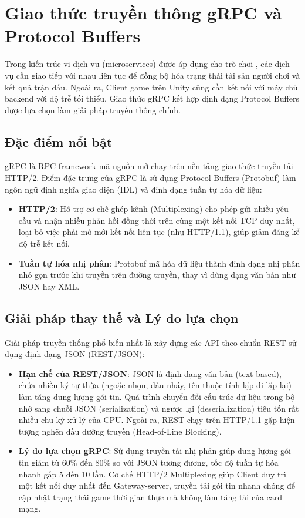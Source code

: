 \documentclass[../Project.tex]{subfiles}
\begin{document}
\section{Giao thức truyền thông gRPC và Protocol Buffers}
\label{sec:tech_grpc}
Trong kiến trúc vi dịch vụ (microservices) được áp dụng cho trò chơi \cite{newman2021building}, các dịch vụ cần giao tiếp với nhau liên tục để đồng bộ hóa trạng thái tài sản người chơi và kết quả trận đấu. Ngoài ra, Client game trên Unity cũng cần kết nối với máy chủ backend với độ trễ tối thiểu. Giao thức gRPC \cite{indrasiri2020grpc} kết hợp định dạng Protocol Buffers được lựa chọn làm giải pháp truyền thông chính.

\subsection{Đặc điểm nổi bật}
gRPC là RPC framework mã nguồn mở chạy trên nền tảng giao thức truyền tải HTTP/2. Điểm đặc trưng của gRPC là sử dụng Protocol Buffers (Protobuf) làm ngôn ngữ định nghĩa giao diện (IDL) và định dạng tuần tự hóa dữ liệu:
\begin{itemize}
    \item \textbf{HTTP/2}: Hỗ trợ cơ chế ghép kênh (Multiplexing) cho phép gửi nhiều yêu cầu và nhận nhiều phản hồi đồng thời trên cùng một kết nối TCP duy nhất, loại bỏ việc phải mở mới kết nối liên tục (như HTTP/1.1), giúp giảm đáng kể độ trễ kết nối.
    \item \textbf{Tuần tự hóa nhị phân}: Protobuf mã hóa dữ liệu thành định dạng nhị phân nhỏ gọn trước khi truyền trên đường truyền, thay vì dùng dạng văn bản như JSON hay XML.
\end{itemize}

\subsection{Giải pháp thay thế và Lý do lựa chọn}
Giải pháp truyền thống phổ biến nhất là xây dựng các API theo chuẩn REST sử dụng định dạng JSON (REST/JSON):
\begin{itemize}
    \item \textbf{Hạn chế của REST/JSON}: JSON là định dạng văn bản (text-based), chứa nhiều ký tự thừa (ngoặc nhọn, dấu nháy, tên thuộc tính lặp đi lặp lại) làm tăng dung lượng gói tin. Quá trình chuyển đổi cấu trúc dữ liệu trong bộ nhớ sang chuỗi JSON (serialization) và ngược lại (deserialization) tiêu tốn rất nhiều chu kỳ xử lý của CPU. Ngoài ra, REST chạy trên HTTP/1.1 gặp hiện tượng nghẽn đầu đường truyền (Head-of-Line Blocking).
    \item \textbf{Lý do lựa chọn gRPC}: Sử dụng truyền tải nhị phân giúp dung lượng gói tin giảm từ 60\% đến 80\% so với JSON tương đương, tốc độ tuần tự hóa nhanh gấp 5 đến 10 lần. Cơ chế HTTP/2 Multiplexing giúp Client duy trì một kết nối duy nhất đến Gateway-server, truyền tải gói tin nhanh chóng để cập nhật trạng thái game thời gian thực mà không làm tăng tải của card mạng.
\end{itemize}
\end{document}
